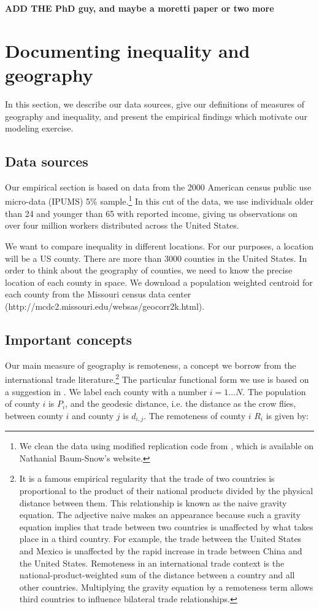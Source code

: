 \documentclass{article}
\begin{document}
\textbf{ADD THE PhD guy, and maybe a moretti paper or two more}

\section{Documenting inequality and geography}

In this section, we describe our data sources, give our definitions of measures of geography and inequality, and present the empirical findings which motivate our modeling exercise.  
\subsection{Data sources}

Our empirical section is based on data from the 2000 American census public use micro-data (IPUMS) 5\% sample.\footnote{We clean the data using modified replication code from \citet{baum2013inequality}, which is available on Nathanial Baum-Snow's website.}  In this cut of the data, we use individuals older than 24 and younger than 65 with reported income, giving us observations on over four million workers distributed across the United States.

We want to compare inequality in different locations.  For our purposes, a location will be a US county.  There are more than 3000 counties in the United States.  In order to think about the geography of counties, we need to know the precise location of each county in space.  We download a population weighted centroid for each county from the Missouri census data center (http://mcdc2.missouri.edu/websas/geocorr2k.html).


\subsection{Important concepts}

Our main measure of geography is remoteness, a concept we borrow from the international trade literature.\footnote{It is a famous empirical regularity that the trade of two countries is proportional to the product of their national products divided by the physical distance between them.  This relationship is known as the naive gravity equation.  The adjective naive makes an appearance because such a gravity equation implies that trade between two countries is unaffected by what takes place in a third country.  For example, the trade between the United States and Mexico is unaffected by the rapid increase in trade between China and the United States.  Remoteness in an international trade context is the national-product-weighted sum of the distance between a country and all other countries.  Multiplying the gravity equation by a remoteness term allows third countries to influence bilateral trade relationships.}  The particular functional form we use is based on a suggestion in \citet{head2003gravity}.  We label each county with a number $i=1\dots N$.  The population of county $i$ is $P_i$, and the geodesic distance, i.e. the distance as the crow flies, between county $i$ and county $j$ is $d_{i,j}$.  The remoteness of county $i$ $R_i$ is given by:
\end{document}
